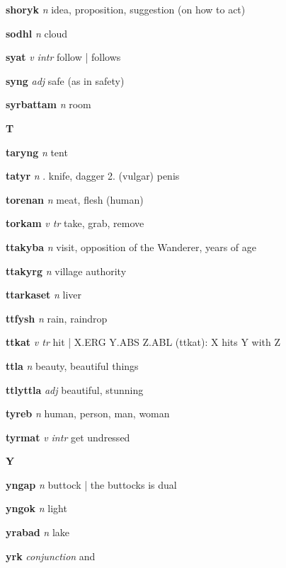\textbf{shoryk}   \emph{n} \textperiodcentered idea, proposition, suggestion (on how to act)

\textbf{sodhl}   \emph{n} \textperiodcentered cloud

\textbf{syat}   \emph{v intr} \textperiodcentered follow | \ABS follows \DAT

\textbf{syng}   \emph{adj} \textperiodcentered safe (as in safety)

\textbf{syrbattam}   \emph{n} \textperiodcentered room

\begin{center} \Huge \bfseries T \end{center}\textbf{taryng}   \emph{n} \textperiodcentered tent

\textbf{tatyr}   \emph{n} . knife, dagger 2. (vulgar) penis 

\textbf{torenan}   \emph{n} \textperiodcentered meat, flesh (human)

\textbf{torkam}   \emph{v tr} \textperiodcentered take, grab, remove

\textbf{ttakyba}   \emph{n} \textperiodcentered visit, opposition of the Wanderer, years of age

\textbf{ttakyrg}   \emph{n} \textperiodcentered village authority

\textbf{ttarkaset}   \emph{n} \textperiodcentered liver

\textbf{ttfysh}   \emph{n} \textperiodcentered rain, raindrop

\textbf{ttkat}   \emph{v tr} \textperiodcentered hit | X.ERG Y.ABS Z.ABL (ttkat): X hits Y with Z

\textbf{ttla}   \emph{n} \textperiodcentered beauty, beautiful things

\textbf{ttlyttla}   \emph{adj} \textperiodcentered beautiful, stunning

\textbf{tyreb}   \emph{n} \textperiodcentered human, person, man, woman

\textbf{tyrmat}   \emph{v intr} \textperiodcentered get undressed

\begin{center} \Huge \bfseries Y \end{center}\textbf{yngap}   \emph{n} \textperiodcentered buttock | the buttocks is dual

\textbf{yngok}   \emph{n} \textperiodcentered light

\textbf{yrabad}   \emph{n} \textperiodcentered lake

\textbf{yrk}   \emph{conjunction} \textperiodcentered and

